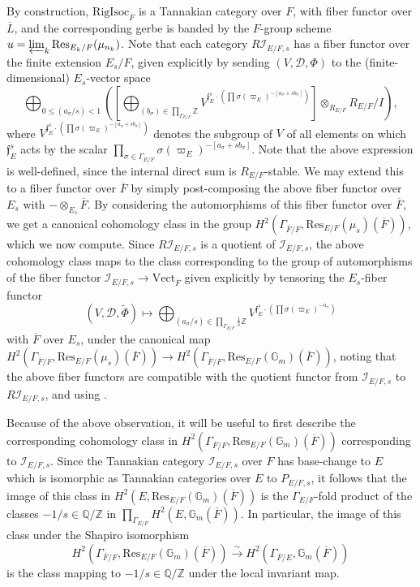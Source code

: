\documentclass[11pt]{amsart}
\theoremstyle{definition}
\newcommand{\mc}{\mathcal}
\newcommand{\Z}{\mathbb{Z}}
\newcommand{\Q}{\mathbb{Q}}
\newcommand{\ov}{\overline}
\newcommand{\mf}{\mathfrak}
\newcommand{\RigIsoc}{\mathrm{RigIsoc}}
\begin{document}
By construction, $\RigIsoc_{F}$ is a Tannakian category over $F$, with fiber functor over $\ov{L}$, and the corresponding gerbe is banded by the $F$-group scheme $u = \varprojlim_{k} \text{Res}_{E_{k}/F} (\mu_{n_{k}})$. Note that each category $R\mc{I}_{E/F,s}$ has a fiber functor over the finite extension $E_{s}/F$, given explicitly by sending $(V, \mc{D}, \Phi)$ to the (finite-dimensional) $E_{s}$-vector space 
\begin{equation}\label{keyfiberfunctor}
\bigoplus_{0 \leq (a_{\sigma}/s) < 1} ([\bigoplus_{(b_{\sigma}) \in \prod_{\Gamma_{E/F}} \Z} V^{\mf{f}_{E}^{s} \cdot (\prod \sigma(\varpi_{E})^{-[a_{\sigma}+sb_{\sigma}]})}] \otimes_{R_{E/F}} R_{E/F}/I),
\end{equation}
where $V^{\mf{f}_{E}^{s} \cdot (\prod \sigma(\varpi_{E})^{-[a_{\sigma}+sb_{\sigma}]})}$ denotes the subgroup of $V$ of all elements on which $\mf{f}_{E}^{s}$ acts by the scalar $\prod_{\sigma \in \Gamma_{E/F}}\sigma(\varpi_{E})^{-[a_{\sigma}+sb_{\sigma}]}$. Note that the above expression is well-defined, since the internal direct sum is $R_{E/F}$-stable. We may extend this to a fiber functor over $\ov{F}$ by simply post-composing the above fiber functor over $E_{s}$ with $- \otimes_{E_{s}} \ov{F}$. By considering the automorphisms of this fiber functor over $\ov{F}$, we get a canonical cohomology class in the group $H^{2}(\Gamma_{\ov{F}/F}, \text{Res}_{E/F}(\mu_{s})(\ov{F}))$, which we now compute. Since $R\mc{I}_{E/F,s}$ is a quotient of $\mc{I}_{E/F,s}$, the above cohomology class maps to the class corresponding to the group of automorphisms of the fiber functor $\mc{I}_{E/F,s} \to \text{Vect}_{\ov{F}}$ given explicitly by tensoring the $E_{s}$-fiber functor $$(V, \mc{D}, \tilde{\Phi}) \mapsto \bigoplus_{(a_{\sigma}/s) \in \prod_{\Gamma_{E/F}} \frac{1}{s}\Z} V^{\mf{f}_{E}^{s} \cdot(\prod \sigma(\varpi_{E})^{-a_{\sigma}})}$$ with $\ov{F}$ over $E_{s}$, under the canonical map $H^{2}(\Gamma_{\ov{F}/F}, \text{Res}_{E/F}(\mu_{s})(\ov{F})) \to H^{2}(\Gamma_{\ov{F}/F}, \text{Res}_{E/F}(\mathbb{G}_{m})(\ov{F}))$, noting that the above fiber functors are compatible with the quotient functor from $\mc{I}_{E/F,s}$ to $R\mc{I}_{E/F,s}$, and using \cite[\S 2.10]{MilneQuot}.

Because of the above observation, it will be useful to first describe the corresponding cohomology class in $H^{2}(\Gamma_{\ov{F}/F}, \text{Res}_{E/F}(\mathbb{G}_{m})(\ov{F}))$ corresponding to $\mc{I}_{E/F,s}$. Since the Tannakian category $\mc{I}_{E/F,s}$ over $F$ has base-change to $E$ which is isomorphic as Tannakian categories over $E$ to $P_{E/F,s}$, it follows that the image of this class in $H^{2}(E, \text{Res}_{E/F}(\mathbb{G}_{m})(\ov{F}))$ is the $\Gamma_{E/F}$-fold product of the classes $-1/s \in \Q/\Z$ in $\prod_{\Gamma_{E/F}} H^{2}(E, \mathbb{G}_{m}(\ov{F}))$. In particular, the image of this class under the Shapiro isomorphism $$H^{2}(\Gamma_{\ov{F}/F}, \text{Res}_{E/F}(\mathbb{G}_{m})(\ov{F})) \xrightarrow{\sim} H^{2}(\Gamma_{\ov{F}/E}, \mathbb{G}_{m}(\ov{F}))$$ is the class mapping to $-1/s \in \mathbb{Q}/\Z$ under the local invariant map.
\end{document}
